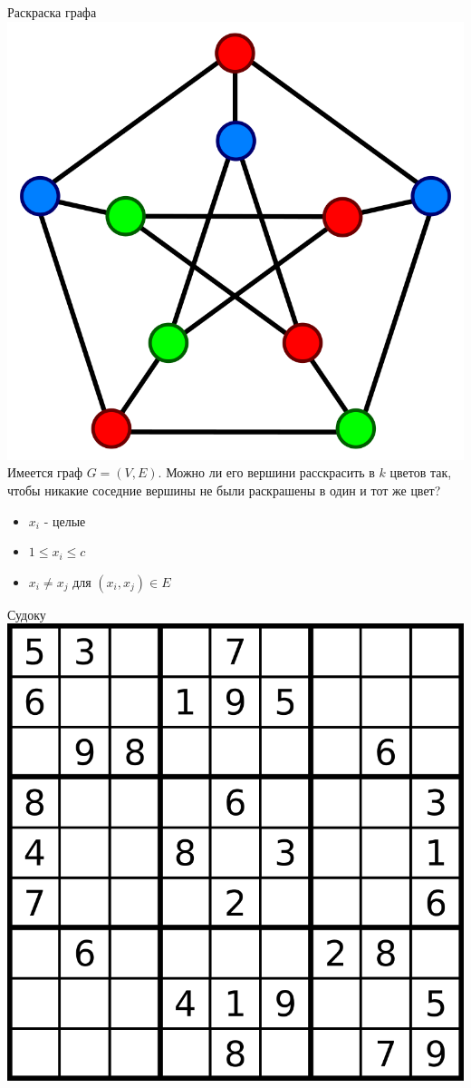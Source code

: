 \documentclass{beamer}
\begin{document}
\begin{frame}{Раскраска графа}
\includegraphics[scale=0.1]{graph-coloring.svg.png}
Имеется граф $G = (V, E)$. Можно ли его вершини расскрасить в $k$ цветов так, чтобы никакие соседние вершины не были раскрашены
в один и тот же цвет?\newline
\begin{itemize}
\item $x_i$ - целые
\item $1 \le x_i \le c$
\item $x_i \neq x_j$ для $(x_i, x_j) \in E$
\end{itemize}
\end{frame}

\begin{frame}{Судоку}
\includegraphics[scale=0.2]{Sudoku.svg.png}
\end{frame}
\end{document}
